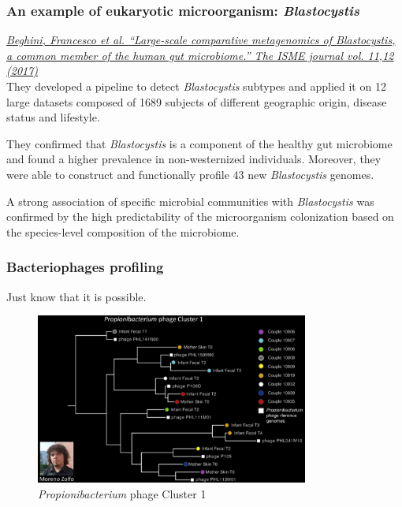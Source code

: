\subsubsection{An example of eukaryotic microorganism: \emph{Blastocystis}}

\href{https://www.nature.com/articles/ismej2017139}{\emph{Beghini, Francesco et al. “Large-scale comparative metagenomics of \emph{Blastocystis}, a common member of the human gut microbiome.” The ISME journal vol. 11,12 (2017)}}\\

They developed a pipeline to detect \emph{Blastocystis} subtypes and applied it on 12 large datasets composed of 1689 subjects of different geographic origin, disease status and lifestyle. 

They confirmed that \emph{Blastocystis} is a component of the healthy gut microbiome and found a higher prevalence in non-westernized individuals. Moreover, they were able to construct and functionally profile 43 new \emph{Blastocystis} genomes.

A strong association of specific microbial communities with \emph{Blastocystis} was confirmed by the high predictability of the microorganism colonization based on the species-level composition of the microbiome.   

\subsubsection{Bacteriophages profiling}

Just know that it is possible.

\begin{figure}[!h]
\centering
\includegraphics[width=0.8\textwidth]{phages.png}
\caption{\label{fig:phages}\emph{Propionibacterium} phage Cluster 1}
\end{figure}

